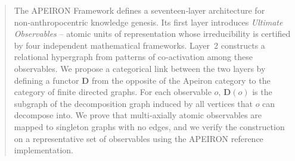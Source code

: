 \begin{abstract}
The APEIRON Framework defines a seventeen‑layer architecture for non‑anthropocentric knowledge genesis.
Its first layer introduces \emph{Ultimate Observables} – atomic units of representation whose irreducibility is certified by four independent mathematical frameworks.
Layer~2 constructs a relational hypergraph from patterns of co‑activation among these observables.
We propose a categorical link between the two layers by defining a functor \(\mathbf{D}\) from the opposite of the Apeiron category to the category of finite directed graphs.
For each observable \(o\), \(\mathbf{D}(o)\) is the subgraph of the decomposition graph induced by all vertices that \(o\) can decompose into.
We prove that multi‑axially atomic observables are mapped to singleton graphs with no edges, and we verify the construction on a representative set of observables using the APEIRON reference implementation.
\end{abstract}